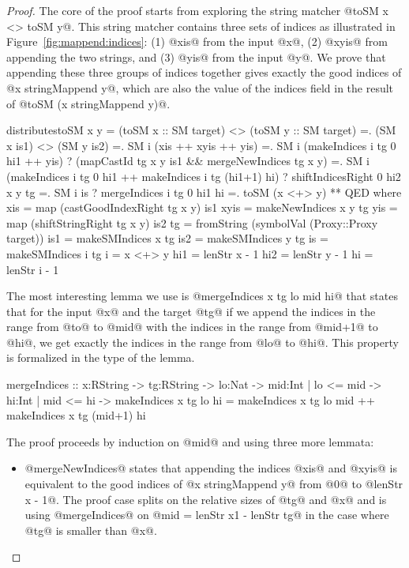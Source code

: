 \begin{proof}
The core of the proof starts from
exploring the string matcher @toSM x <> toSM y@.
%
This string matcher contains three sets of indices
as illustrated in Figure~\ref{fig:mappend:indices}:
(1) @xis@ from the input @x@,
(2) @xyis@ from appending the two strings, and
(3) @yis@ from the input @y@.
%
We prove that appending these three groups of indices together gives
exactly the good indices of @x stringMappend y@, which are also the
value of the indices field in the result of
%
@toSM (x stringMappend y)@.
\begin{code}
  distributestoSM x y
    =  (toSM x :: SM target) <> (toSM y :: SM target)
    =. (SM x is1) <> (SM y is2)
    =. SM i (xis ++ xyis ++ yis)
    =. SM i (makeIndices i tg 0 hi1 ++ yis)
       ? (mapCastId tg x y is1 && mergeNewIndices tg x y)
    =. SM i (makeIndices i tg 0 hi1 ++ makeIndices i tg (hi1+1) hi)
       ? shiftIndicesRight 0 hi2 x y tg
    =. SM i is
       ? mergeIndices i tg 0 hi1 hi
    =. toSM (x <+> y)
    ** QED
    where
      xis  = map (castGoodIndexRight tg x y) is1
      xyis = makeNewIndices x y tg
      yis  = map (shiftStringRight   tg x y) is2
      tg   = fromString (symbolVal (Proxy::Proxy target))
      is1  = makeSMIndices x tg
      is2  = makeSMIndices y tg 
      is   = makeSMIndices i tg
      i    = x <+> y
      hi1  = lenStr x - 1
      hi2  = lenStr y - 1
      hi   = lenStr i - 1
\end{code}
%
The most interesting lemma we use is
@mergeIndices x tg lo mid hi@
that states that for the input @x@ and the target @tg@
if we append the indices in the range  from @to@ to @mid@
with the indices in the range from @mid+1@ to @hi@,
we get exactly the indices in the range from @lo@ to @hi@.
%
This property is formalized in the type of the lemma.
\begin{code}
  mergeIndices
   :: x:RString -> tg:RString
    -> lo:Nat -> mid:{Int | lo <= mid} -> hi:{Int | mid <= hi}
    -> {   makeIndices x tg lo hi
       =  makeIndices x tg lo mid
       ++ makeIndices x tg (mid+1) hi}
\end{code}
%
The proof proceeds by induction on @mid@ and using three more lemmata:
\begin{itemize}
\item @mergeNewIndices@ states that appending the indices @xis@ and @xyis@
is equivalent to the good indices of @x stringMappend y@ from @0@ to @lenStr x - 1@.
%
The proof case splits on the relative sizes of @tg@ and @x@
and is using @mergeIndices@ on @mid = lenStr x1 - lenStr tg@
in the case where @tg@ is smaller than @x@.

\end{itemize}
\end{proof}

